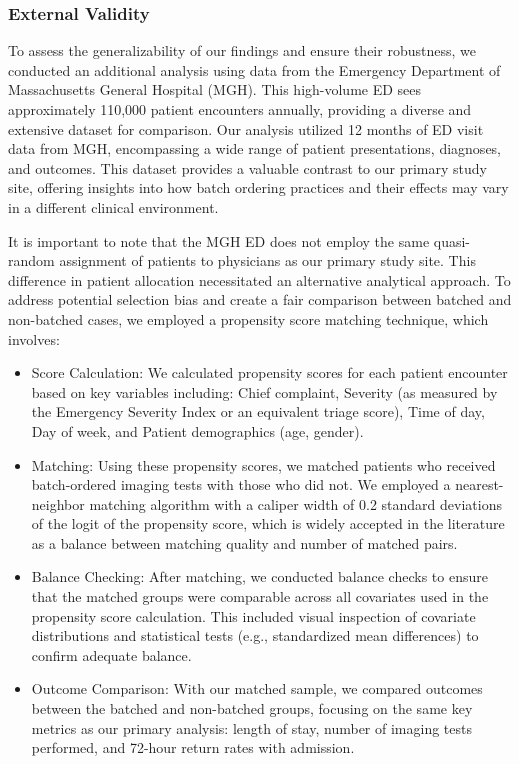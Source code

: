 \documentclass[,,nonblindrev]{informs}
\begin{document}
\hypertarget{external-validity}{%
\subsubsection{External Validity}\label{external-validity}}

To assess the generalizability of our findings and ensure their
robustness, we conducted an additional analysis using data from the
Emergency Department of Massachusetts General Hospital (MGH). This
high-volume ED sees approximately 110,000 patient encounters annually,
providing a diverse and extensive dataset for comparison. Our analysis
utilized 12 months of ED visit data from MGH, encompassing a wide range
of patient presentations, diagnoses, and outcomes. This dataset provides
a valuable contrast to our primary study site, offering insights into
how batch ordering practices and their effects may vary in a different
clinical environment.

It is important to note that the MGH ED does not employ the same
quasi-random assignment of patients to physicians as our primary study
site. This difference in patient allocation necessitated an alternative
analytical approach. To address potential selection bias and create a
fair comparison between batched and non-batched cases, we employed a
propensity score matching technique, which involves:

\begin{itemize}
\item
  Score Calculation: We calculated propensity scores for each patient
  encounter based on key variables including: Chief complaint, Severity
  (as measured by the Emergency Severity Index or an equivalent triage
  score), Time of day, Day of week, and Patient demographics (age,
  gender).
\item
  Matching: Using these propensity scores, we matched patients who
  received batch-ordered imaging tests with those who did not. We
  employed a nearest-neighbor matching algorithm with a caliper width of
  0.2 standard deviations of the logit of the propensity score, which is
  widely accepted in the literature as a balance between matching
  quality and number of matched pairs.
\item
  Balance Checking: After matching, we conducted balance checks to
  ensure that the matched groups were comparable across all covariates
  used in the propensity score calculation. This included visual
  inspection of covariate distributions and statistical tests (e.g.,
  standardized mean differences) to confirm adequate balance.
\item
  Outcome Comparison: With our matched sample, we compared outcomes
  between the batched and non-batched groups, focusing on the same key
  metrics as our primary analysis: length of stay, number of imaging
  tests performed, and 72-hour return rates with admission.
\end{itemize}
\end{document}
